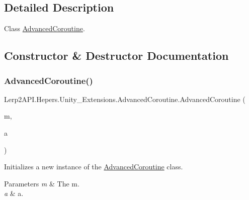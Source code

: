 \subsection{Detailed Description}
Class \hyperlink{class_lerp2_a_p_i_1_1_hepers_1_1_unity___extensions_1_1_advanced_coroutine}{Advanced\+Coroutine}. 



\subsection{Constructor \& Destructor Documentation}
\mbox{\label{class_lerp2_a_p_i_1_1_hepers_1_1_unity___extensions_1_1_advanced_coroutine_a14d132def872c565dfa3b77d6f832232}} 
\subsubsection{\texorpdfstring{Advanced\+Coroutine()}{AdvancedCoroutine()}}
{\footnotesize\ttfamily Lerp2\+A\+P\+I.\+Hepers.\+Unity\+\_\+\+Extensions.\+Advanced\+Coroutine.\+Advanced\+Coroutine (\begin{DoxyParamCaption}\item[{Mono\+Behaviour}]{m,  }\item[{Action$<$ \hyperlink{class_lerp2_a_p_i_1_1_hepers_1_1_unity___extensions_1_1_advanced_coroutine}{Advanced\+Coroutine} $>$}]{a }\end{DoxyParamCaption})\hspace{0.3cm}{\ttfamily [inline]}}



Initializes a new instance of the \hyperlink{class_lerp2_a_p_i_1_1_hepers_1_1_unity___extensions_1_1_advanced_coroutine}{Advanced\+Coroutine} class. 


\begin{DoxyParams}{Parameters}
{\em m} & The m.\\
\hline
{\em a} & a.\\
\hline
\end{DoxyParams}


